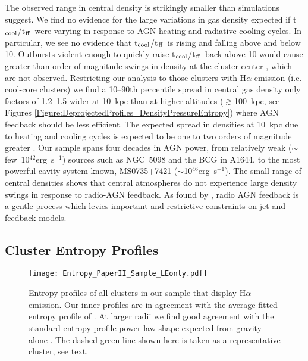 \documentclass[twocolumn]{aastex6}
\newcommand{\tctff}{{t$_{\rm cool}$/t$_{\rm ff}$}}
\begin{document}
The observed range in central density is strikingly smaller than simulations suggest.  We find no evidence for the large variations in gas density expected if \tctff\ were varying in response to AGN heating and radiative cooling cycles.  In particular, we see no evidence that \tctff\ is rising and falling above and below 10.  Outbursts violent enough to quickly raise \tctff\ back above 10 would cause greater than order-of-magnitude swings in density at the cluster center \cite[$\lesssim$20~kpc, e.g.][]{Sijacki06,Gaspari12,Li15,Prasad15}, which are not observed.  Restricting our analysis to those clusters with H$\alpha$ emission (i.e. cool-core clusters) we find a 10--90th percentile spread in central gas density only factors of 1.2--1.5 wider at 10~kpc than at higher altitudes ($\gtrsim$100~kpc, see Figures \ref{Figure:DeprojectedProfiles_DensityPressureEntropy}) where AGN feedback should be less efficient.  The expected spread in densities at 10~kpc due to heating and cooling cycles is expected to be one to two orders of magnitude greater \cite[e.g.][]{Li15}.  Our sample spans four decades in AGN power, from relatively weak ($\sim$few~10$^{42}$erg~s$^{-1}$) sources such as NGC~5098 and the BCG in A1644, to the most powerful cavity system known, MS0735+7421 ($\sim$10$^{46}$erg~s$^{-1}$).  The small range of central densities shows that central atmospheres do not experience large density swings in response to radio-AGN feedback.  As found by \citet[][]{McNamara16}, radio AGN feedback is a gentle process which levies important and restrictive constraints on jet and feedback models. 


\subsection{Cluster Entropy Profiles} \label{Section:EntropyProfiles}

\begin{figure}
	\texttt{[image: Entropy\_PaperII\_Sample\_LEonly.pdf]}
    \caption{Entropy profiles of all clusters in our sample that display H$\alpha$ emission.  Our inner profiles are in agreement with the average fitted entropy profile of \citet[][]{Panagoulia14a}.  At larger radii we find good agreement with the standard entropy profile power-law shape expected from gravity alone \cite[][]{Tozzi01,Voit05a}.  The dashed green line shown here is taken as a representative cluster, see text.}
    \label{EntropyProfiles}
\end{figure}
\end{document}
